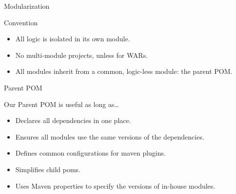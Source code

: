 \documentclass[presentation]{beamer}
\begin{document}
{
\begin{frame}[label=sec-5-2]{Modularization}

\begin{block}{Convention}
\begin{itemize}
\item All logic is isolated in its own module.
\item No multi-module projects, unless for WARs.
\item All modules inherit from a common, logic-less module: the parent POM.
\end{itemize}
\end{block}
\end{frame}
} %

{
\begin{frame}[label=sec-5-3]{Parent POM}

\begin{block}{Our Parent POM is useful as long as\ldots{}}

\begin{itemize}
\item Declares all dependencies in one place.
\item Ensures all modules use the same versions of the dependencies.
\item Defines common configurations for maven plugins.
\item Simplifies child poms.
\item Uses Maven properties to specify the versions of in-house modules.
\end{itemize}
\end{block}
\end{frame}
} %
\end{document}
